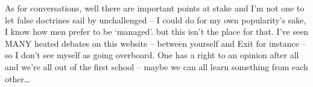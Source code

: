 \begin{footnotesize}
\begin{sffamily}
As for conversations, well there are important points at stake and I'm not one to let false doctrines sail by unchallenged – I could do for my own popularity's sake, I know how men prefer to be `managed'. but this isn't the place for that. I've seen MANY heated debates on this website – between yourself and Exit for instance – so I don't see myself as going overboard. One has a right to an opinion after all and we're all out of the first school – maybe we can all learn something from each other…


\hfill


\end{sffamily}\end{footnotesize}
